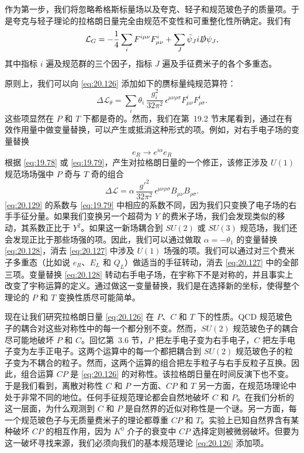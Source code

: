 作为第一步，我们将忽略希格斯标量场以及夸克、轻子和规范玻色子的质量项。于是夸克与轻子理论的拉格朗日量完全由规范不变性和可重整化性所确定。我们有
\begin{equation}
  \mathcal{L}_{G} = -\frac{1}{4}\sum_i F^{i\mu\nu}F^i_{\mu\nu}
    + \sum_J \bar{\psi}_J i\slashed{D}\psi_J ,
  \label{eq:20.126}
\end{equation}
其中指标 $i$ 遍及规范群的三个因子，指标 $J$ 遍及手征费米子的各个多重态。

原则上，我们可以向 \eqref{eq:20.126} 添加如下的赝标量纯规范算符：
\begin{equation}
  \Delta\mathcal{L}_{\theta} = \sum_i \theta_i\ \frac{g_i^2}{32\pi^2}\,
    \epsilon^{\mu\nu\rho\sigma}F^i_{\mu\nu}F^i_{\rho\sigma} .
  \label{eq:20.127}
\end{equation}
这些项显然在 $P$ 和 $T$ 下都是奇的。然而，我们在第~19.2 节末尾看到，通过在有效作用量中做变量替换，可以产生或抵消这种形式的项。例如，对右手电子场的变量替换
\begin{equation}
  e_R \to e^{i\alpha}e_R
  \label{eq:20.128}
\end{equation}
根据 \eqref{eq:19.78} 或 \eqref{eq:19.79}，产生对拉格朗日量的一个修正，该修正涉及 $U(1)$ 规范场场强中 $P$ 奇与 $T$ 奇的组合
\begin{equation}
  \Delta\mathcal{L} = \alpha\,\frac{g'^2}{32\pi^2}\,
    \epsilon^{\mu\nu\rho\sigma}B_{\mu\nu}B_{\rho\sigma} .
  \label{eq:20.129}
\end{equation}
\eqref{eq:20.129} 的系数与 \eqref{eq:19.79} 中相应的系数不同，因为我们只变换了电子场的右手手征分量。如果我们变换另一个超荷为 $Y$ 的费米子场，我们会发现类似的移动，其系数正比于 $Y^2$。如果这一新场耦合到 $SU(2)$ 或 $SU(3)$ 规范场，我们还会发现正比于那些场强的项。因此，我们可以通过做取 $\alpha = -\theta_1$ 的变量替换 \eqref{eq:20.128}，消去 \eqref{eq:20.127} 中涉及 $U(1)$ 场强的项。我们可以通过对三个费米子多重态（比如说 $e_R$、$E_L$ 和 $Q_L$）做适当的手征转动，消去 \eqref{eq:20.127} 中的全部三项。变量替换 \eqref{eq:20.128} 转动右手电子场，在宇称下不是对称的，并且事实上改变了宇称运算的定义。通过做这一变量替换，我们是在选择新的坐标，使得整个理论的 $P$ 和 $T$ 变换性质尽可能简单。

现在让我们研究拉格朗日量 \eqref{eq:20.126} 在 $P$、$C$ 和 $T$ 下的性质。QCD 规范玻色子的耦合对这些对称性中的每一个都分别不变。然而，$SU(2)$ 规范玻色子的耦合尽可能地破坏 $P$ 和 $C$。回忆第~3.6 节，$P$ 把左手电子变为右手电子，$C$ 把左手电子变为左手正电子。这两个运算中的每一个都把耦合到 $SU(2)$ 规范玻色子的粒子变为不耦合的粒子。然而，这两个运算的组合把左手粒子与右手反粒子互换。因此，组合运算 $CP$ 是 \eqref{eq:20.126} 的对称性。该拉格朗日量在时间反演下也不变。于是我们看到，离散对称性 $C$ 和 $P$ 一方面、$CP$ 和 $T$ 另一方面，在规范场理论中处于非常不同的地位。任何手征规范理论都会自然地破坏 $C$ 和 $P$。在我们分析的这一层面，为什么观测到 $C$ 和 $P$ 是自然界的近似对称性是一个谜。另一方面，每一个规范玻色子与无质量费米子的理论都尊重 $CP$ 和 $T$。实验上已知自然界含有某种破坏 $CP$ 的相互作用，因为 $K^0$ 介子的衰变中 $CP$ 选择定则被微弱破坏。但要为这一破坏寻找来源，我们必须向我们的基本规范理论 \eqref{eq:20.126} 添加项。

